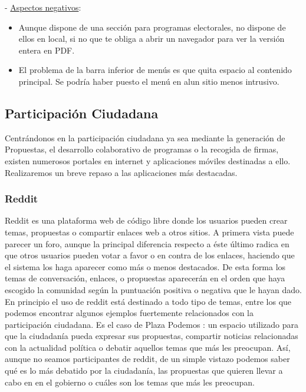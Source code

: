  - \underline{Aspectos negativos}:

\begin{itemize}
	\item Aunque dispone de una sección para programas electorales, no dispone de ellos en local, si no que te obliga a abrir un navegador para ver la versión entera en PDF.
	\item El problema de la barra inferior de menús es que quita espacio al contenido principal. Se podría haber puesto el menú en alun sitio menos intrusivo.
\end{itemize}

\subsection{Participación Ciudadana} \label{ssec:artProposals}

Centrándonos en la participación ciudadana ya sea mediante la generación de Propuestas, el desarrollo colaborativo de programas o la recogida de firmas, existen numerosos portales en internet y aplicaciones móviles destinadas a ello. Realizaremos un breve repaso a las aplicaciones más destacadas.

\subsubsection{Reddit}

Reddit \cite{ref:reddit} es una plataforma web de código libre donde los usuarios pueden crear temas, propuestas o compartir enlaces web a otros sitios. A primera vista puede parecer un foro, aunque la principal diferencia respecto a éste último radica en que otros usuarios pueden votar a favor o en contra de los enlaces, haciendo que el sistema los haga aparecer como más o menos destacados. De esta forma los temas de conversación, enlaces, o propuestas aparecerán en el orden que haya escogido la comunidad según la puntuación positiva o negativa que le hayan dado.
En principio el uso de reddit está destinado a todo tipo de temas, entre los que podemos encontrar algunos ejemplos fuertemente relacionados con la participación ciudadana. Es el caso de Plaza Podemos \cite{ref:plazaPodemos}: un espacio utilizado para que la ciudadanía pueda expresar sus propuestas, compartir noticias relacionadas con la actualidad política o debatir aquellos temas que más les preocupan. Así, aunque no seamos participantes de reddit, de un simple vistazo podemos saber qué es lo más debatido por la ciudadanía, las propuestas que quieren llevar a cabo en en el gobierno o cuáles son los temas que más les preocupan.

